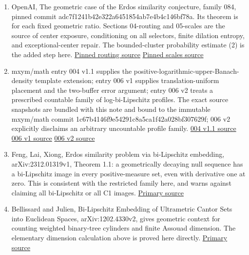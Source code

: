 \documentclass[
  11pt,
]{article}
\providecommand{\tightlist}{%
  \setlength{\itemsep}{0pt}\setlength{\parskip}{0pt}}
\theoremstyle{remark}\newtheorem{remark}[theorem]{Remark}
\begin{document}
\begin{enumerate}
\def\labelenumi{\arabic{enumi}.}
\tightlist
\item
  OpenAI, The geometric case of the Erdos similarity conjecture, family
  084, pinned commit adc7f1241b42e322a6451854ab7e4b4c146bf78a. Its
  theorem is for each fixed geometric ratio. Sections 04-routing and
  05-scales are the source of center exposure, conditioning on all
  selectors, finite dilation entropy, and exceptional-center repair. The
  bounded-cluster probability estimate (2) is the added step here.
  \href{https://github.com/openai/math/blob/adc7f1241b42e322a6451854ab7e4b4c146bf78a/preprints/The-geometric-case-of-the-Erdos-similarity-conjecture-October-5-2026/build/sections/04-routing.tex}{Pinned
  routing source}
  \href{https://github.com/openai/math/blob/adc7f1241b42e322a6451854ab7e4b4c146bf78a/preprints/The-geometric-case-of-the-Erdos-similarity-conjecture-October-5-2026/build/sections/05-scales.tex}{Pinned
  scales source}
\item
  mxym/math entry 004 v1.1 supplies the
  positive-logarithmic-upper-Banach- density template extension; entry
  006 v1 supplies translation-uniform placement and the two-buffer error
  argument; entry 006 v2 treats a prescribed countable family of
  log-bi-Lipschitz profiles. The exact source snapshots are bundled with
  this note and bound to the immutable mxym/math commit
  1c67b4146f9e54291c8a5ca1f42a028bf307629f; 006 v2 explicitly disclaims
  an arbitrary uncountable profile family.
  \href{https://github.com/mxym/math/blob/1c67b4146f9e54291c8a5ca1f42a028bf307629f/preprints/004-log-density-similarity/v1.1/build/main.tex}{004
  v1.1 source}
  \href{https://github.com/mxym/math/blob/1c67b4146f9e54291c8a5ca1f42a028bf307629f/preprints/006-modulus-nonlinear-similarity/v1/main.tex}{006
  v1 source}
  \href{https://github.com/mxym/math/blob/1c67b4146f9e54291c8a5ca1f42a028bf307629f/preprints/006-modulus-nonlinear-similarity/v2/paper.md}{006
  v2 source}
\item
  Feng, Lai, Xiong, Erdos similarity problem via bi-Lipschitz embedding,
  arXiv:2312.01319v1, Theorem 1.1: a geometrically decaying null
  sequence has a bi-Lipschitz image in every positive-measure set, even
  with derivative one at zero. This is consistent with the restricted
  family here, and warns against claiming all bi-Lipschitz or all C1
  images. \href{https://arxiv.org/html/2312.01319v1}{Primary source}
\item
  Bellissard and Julien, Bi-Lipschitz Embedding of Ultrametric Cantor
  Sets into Euclidean Spaces, arXiv:1202.4330v2, gives geometric context
  for counting weighted binary-tree cylinders and finite Assouad
  dimension. The elementary dimension calculation above is proved here
  directly. \href{https://arxiv.org/abs/1202.4330v2}{Primary source}
\end{enumerate}
\end{document}
